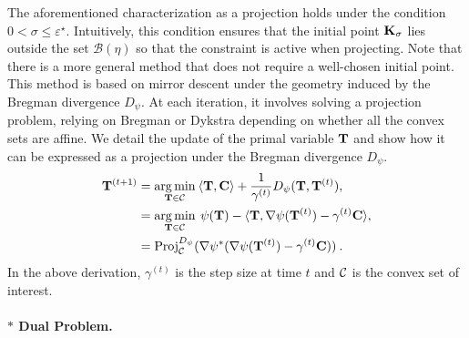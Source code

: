 \begin{remark}\label{rem:mirror_descent}
    The aforementioned characterization as a projection holds under the condition $0 < \sigma \leq \varepsilon^\star$. Intuitively, this condition ensures that the initial point ${\mathbf{K}}_\sigma$ lies outside the set $\mathcal{B}(\eta)$ so that the constraint is active when projecting.
    Note that there is a more general method that does not require a well-chosen initial point. This method is based on mirror descent under the geometry induced by the Bregman divergence $D_\psi$. At each iteration, it involves solving a projection problem, relying on Bregman or Dykstra depending on whether all the convex sets are affine. We detail the update of the primal variable ${\mathbf{T}}$ and show how it can be expressed as a projection under the Bregman divergence $D_\psi$.
    \begin{align}
    {\mathbf{T}}^{(t+1)} &= \operatorname*{arg\,min}_{{\mathbf{T}} \in {\mathcal{C}}} \: \langle {\mathbf{T}}, {\mathbf{C}} \rangle + \frac{1}{\gamma^{(t)}} D_{\psi}({\mathbf{T}}, {\mathbf{T}}^{(t)}), \\
    &= \operatorname*{arg\,min}_{{\mathbf{T}} \in {\mathcal{C}}} \: \psi({\mathbf{T}}) - \langle {\mathbf{T}}, \nabla \psi({\mathbf{T}}^{(t)}) - \gamma^{(t)} {\mathbf{C}} \rangle, \\
    &= \operatorname{Proj}^{D_\psi}_{{\mathcal{C}}}(\nabla \psi^*(\nabla \psi({\mathbf{T}}^{(t)}) - \gamma^{(t)} {\mathbf{C}})) \:.
    \end{align}
    In the above derivation, $\gamma^{(t)}$ is the step size at time $t$ and ${\mathcal{C}}$ is the convex set of interest.
\end{remark}    


\paragraph{$\ast$ Dual Problem.}

